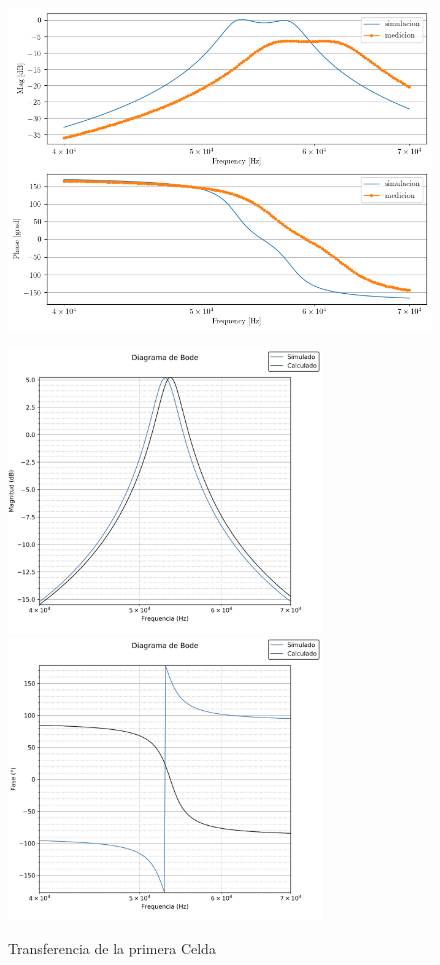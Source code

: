 \begin{figure}[ht]
\begin{center}
\includegraphics[width=0.7\linewidth]{../Ex2/Informe/simymed.png}
\end{center}
\end{figure}

\begin{figure}[ht]
\begin{center}
\includegraphics[height=7.5cm]{../Ex2/Informe/TransferenciaCell1.jpeg}
\includegraphics[height=7.5cm]{../Ex2/Informe/FaseCell1.jpeg}
\caption{Transferencia de la primera Celda}
\label{fig:e2 H cell1}
\end{center}
\end{figure}

